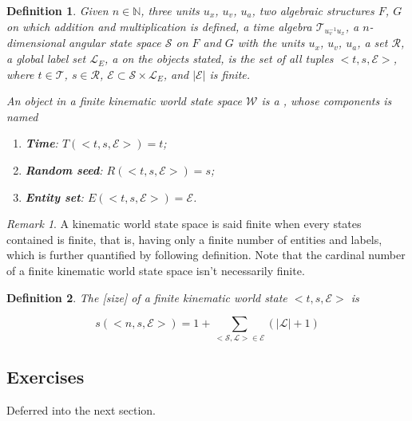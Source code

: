 \documentclass{book}
\newtheorem{definition}{Definition}
\theoremstyle{definition}\newtheorem{mechanism}{Mechanism}
\theoremstyle{remark}\newtheorem*{remark}{Remark}
\begin{document}
\begin{definition}
	Given $n\in \mathbb N$, three units $u_x$, $u_v$, $u_a$, two algebraic structures $F$, $G$ on which addition and multiplication is defined, a time algebra $\mathcal T_{u_v^{-1}u_x}$, a $n$-dimensional angular state space $\mathcal S$ on $F$ and $G$ with the units $u_x$, $u_v$, $u_a$, a set $\mathcal R$, a global label set $\mathcal L_E$, a  on the objects stated, is the set of all tuples $<t, s, \mathcal E>$, where $t\in \mathcal T$, $s\in \mathcal R$, $\mathcal E\subset \mathcal S\times \mathcal L_E$, and $|\mathcal E|$ is finite.
	
	An object in a finite kinematic world state space $\mathcal W$ is a , whose components is named
	
	\begin{enumerate}
		\item {\bf{Time}}: $T(<t, s, \mathcal E>) = t$;
		\item {\bf{Random seed}}: $R(<t, s, \mathcal E>) = s$;
		\item {\bf{Entity set}}: $E(<t, s, \mathcal E>) = \mathcal E$.
	\end{enumerate}
\end{definition}

\begin{remark}
	A kinematic world state space is said finite when every states contained is finite, that is, having only a finite number of entities and labels, which is further quantified by following definition. Note that the cardinal number of a finite kinematic world state space isn't necessarily finite.
\end{remark}

\begin{definition}
	The [size] of a finite kinematic world state $<t, s, \mathcal E>$ is
	
	\begin{equation*}
		s(<n, s, \mathcal E>) = 1 + \sum_{<\mathcal S, \mathcal L> \in \mathcal E} (|\mathcal L| + 1)
	\end{equation*}
\end{definition}

\subsection*{Exercises}

Deferred into the next section.
\end{document}
